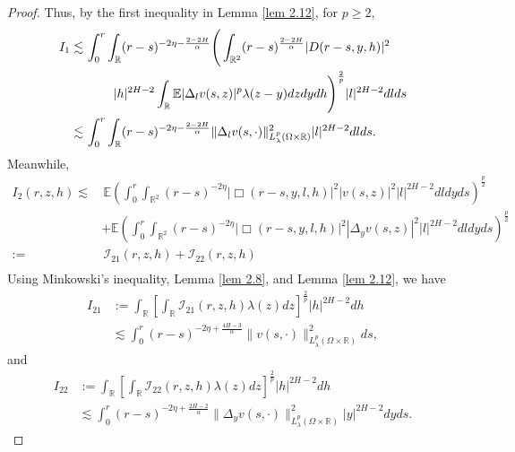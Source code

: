 \documentclass[11pt,reqno]{amsart}
\numberwithin{equation}{section}
\newcommand{\1}{{\bf 1}}
\newcommand{\2}{{\bf 2}}
\begin{document}
\begin{proof}
 Thus, 
by the first inequality in Lemma \ref{lem 2.12},   for $p\ge2$, 
\begin{equation}\label{eq 4.23}
\begin{split}
I_1 \lesssim&\, \int_0^r\int_{\mathbb{R}}(r-s)^{-2\eta-\frac{2-2H}{\alpha}}\Bigg(\int_{\mathbb{R}^2}(r-s)^{\frac{2-2H}{\alpha}}|D(r-s,y,h)|^2 \\
&\hskip12pt \hskip12pt |h|^{2H-2}\int_{\mathbb{R}}\mathbb{E}|\Delta_lv(s,z)|^p\lambda(z-y)dzdydh\Bigg)^{\frac{2}{p}}|l|^{2H-2}dlds \\
 \lesssim&\, \int_0^r\int_{\mathbb{R}}(r-s)^{-2\eta-\frac{2-2H}{\alpha}}\|\Delta_lv(s,\cdot)\|^2_{L^p_{\lambda}(\Omega\times \mathbb{R})}|l|^{2H-2}dlds.
\end{split}
\end{equation}
  Meanwhile,
\begin{equation}\label{eq 4.24}
\begin{split}
I_2(r,z,h) \lesssim & \,  \mathbb{E}\left(\int_0^r\int_{\mathbb{R}^2}(r-s)^{-2\eta}|\Box(r-s,y,l,h)|^2| v(s,z)|^2|l|^{2H-2}dldyds\right)^{\frac{p}{2}} \\
&+\mathbb{E}\left(\int_0^r\int_{\mathbb{R}^2}(r-s)^{-2\eta}|\Box(r-s,y,l,h)|^2| \Delta_yv(s,z)|^2|l|^{2H-2}dldyds\right)^{\frac{p}{2}}\\
 :=&\,\mathcal  I_{21}(r,z,h)+\mathcal I_{22}(r,z,h) \\
\end{split}
\end{equation}
Using  Minkowski's inequality,   Lemma \ref{lem 2.8}, and Lemma \ref{lem 2.12}, we have
\begin{equation}\label{eq 4.25}
\begin{split}
I_{21}&:=\int_{\mathbb{R}}\left[\int_{\mathbb{R}}\mathcal{I}_{21}(r,z,h)\lambda(z)dz\right]^{\frac2{p}}|h|^{2H-2}dh \\
&\lesssim \int_0^r (r-s)^{-2\eta+\frac{4H-3}{\alpha}} \| v(s,\cdot)\|^2_{L^p_{\lambda}(\Omega\times \mathbb{R})}ds,
\end{split}
\end{equation}
and
\begin{equation}\label{eq 4.26}
\begin{split}
I_{22}&:=\int_{\mathbb{R}}\left[\int_{\mathbb{R}}\mathcal{I}_{22}(r,z,h)\lambda(z)dz\right]^{\frac2{p}}|h|^{2H-2}dh \\
&\lesssim \int_0^r (r-s)^{-2\eta+\frac{2H-2}{\alpha}} \| \Delta_yv(s,\cdot)\|^2_{L^p_{\lambda}(\Omega\times \mathbb{R})}|y|^{2H-2}dy ds.
\end{split}

\end{equation}
\end{proof}
\end{document}

